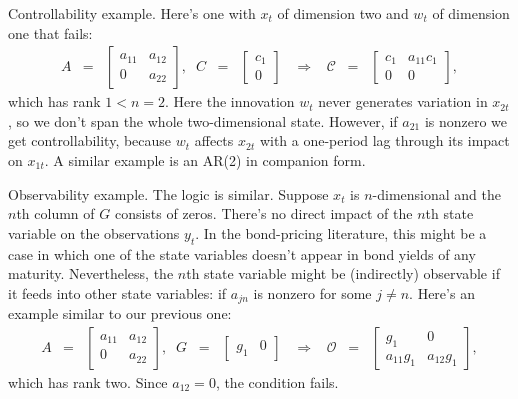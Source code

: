 \documentclass[12pt]{article}
\begin{document}
{Controllability example.
Here's one with $x_t$ of dimension two and $w_t$ of dimension one that fails:
\begin{eqnarray*}
    A &=&
    \left[
    \begin{array}{cc}
        a_{11} & a_{12} \\ 0 & a_{22}
    \end{array}
    \right],
    \;\;
    C \;\;=\;\;
    \left[
    \begin{array}{c}
        c_{1} \\ 0
    \end{array}
    \right]
    \;\;\;\Rightarrow \;\;\;
    \mathcal{C} \;\;=\;\;
    \left[
    \begin{array}{cc}
        c_{1} & a_{11} c_1 \\ 0 & 0
    \end{array}
    \right] ,
\end{eqnarray*}
which has rank $1 < n=2 $.
Here the innovation $w_t$ never generates variation in $x_{2t}$,
so we don't span the whole two-dimensional state.
However, if $a_{21}$ is nonzero we get controllability,
because $w_t$ affects $x_{2t}$ with a one-period lag through its impact on $x_{1t}$.
A similar example is an AR(2) in companion form.

Observability example.  The logic is similar.
Suppose $x_t$ is $n$-dimensional and the $n$th column of $G$
consists of zeros.
There's no direct impact of the $n$th state variable on
the observations $y_t$.
In the bond-pricing literature,
this might be a case in which one of the state variables
doesn't appear in bond yields of any maturity.
Nevertheless, the $n$th state variable might be (indirectly)
observable if it feeds into other state variables:
if $a_{jn}$ is nonzero for some $j\neq n$.
Here's an example similar to our previous one:
\begin{eqnarray*}
    A &=&
    \left[
    \begin{array}{cc}
        a_{11} & a_{12} \\  0 & a_{22}
    \end{array}
    \right],
    \;\;
    G \;\;=\;\;
    \left[
    \begin{array}{cc}
        g_{1} &  0
    \end{array}
    \right]
    \;\;\;\Rightarrow \;\;\;
    \mathcal{O} \;\;=\;\;
    \left[
    \begin{array}{cc}
        g_{1} & 0 \\ a_{11} g_1 & a_{12} g_1
    \end{array}
    \right] ,
\end{eqnarray*}
which has rank two.
Since $a_{12} = 0$, the condition fails.

}
\end{document}
